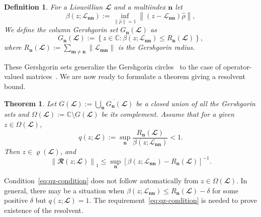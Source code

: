 \documentclass{SciPost}
\newtheorem{theorem}{Theorem}
\newtheorem{definition}{Definition}
\begin{document}
\begin{definition}
    For a Liouvillian $\mathbfcal L$ and a multiindex $\bm n$ let
    \begin{equation}
        \beta(z; \mathcal L_{\bm{n n}})
        :=
        \inf_{\|\hat \rho\| = 1}
        \left\|
        (z - \mathcal L_{\bm n\bm n})\hat \rho
        \right\|,
    \end{equation}
    We define the \emph{column Gershgorin set} $G_{\bm n}(\mathbfcal L)$ as
    \begin{equation}
        G_{\bm n}(\mathbfcal L)
        :=
        \left\{
        z \in \mathbb C :
            \beta(z; \mathcal L_{\bm{n n}}) \leqslant R_{\bm n}(\mathbfcal L)
        \right\},
    \end{equation}
    where $R_{\bm n}(\mathbfcal L)
    :=
    \sum_{\bm m \ne \bm n}
    \|\mathcal L_{\bm m\bm n}\|$ is the \emph{Gershgorin radius}.
    \label{def:gershgorin-set}
\end{definition}
These Gershgorin sets generalize the Gershgorin circles~\cite{Gershgorin1931} to the case of operator-valued matrices~\cite{Salas1999}. We are now ready to formulate a theorem giving a resolvent bound.
\begin{theorem}
    Let
    $
    G(\mathbfcal L)
    :=
    \overline{\bigcup_{\bm n} G_{\bm n}(\mathbfcal L)}
    $
    be a closed union of all the Gershgorin sets and 
    $
    \Omega(\mathbfcal L)
    :=
    \mathbb C \setminus G(\mathbfcal L)
    $
    be its complement.
    Assume that for a given \(z \in \Omega(\mathbfcal L)\),
\begin{equation}
    q(z;\mathbfcal L)
    :=
    \sup_{\bm n}
    \frac{R_{\bm n}(\mathbfcal L)}{\beta(z; \mathcal L_{\bm{n n}})}
    < 1.
    \label{eq:qz-condition}
\end{equation}
Then \(z \in \varrho(\mathbfcal L)\), and
\begin{equation}
    \left\|
    \mathbfcal R(z;\mathbfcal L)
    \right\|_1
    \leqslant
    \sup_{\bm n}
    \left[
        \beta(z; \mathcal L_{\bm{nn}}) - R_{\bm n}(\mathbfcal L)
    \right]^{-1}.
    \label{eq:resolvent-bound-hard-clean}
\end{equation}
\label{th:gershgorin-hard}
\end{theorem}
Condition~\eqref{eq:qz-condition} does not follow automatically from $z \in \Omega(\mathbfcal L)$. In general, there may be a situation when $\beta(z; \mathcal L_{\bm{nn}}) \leqslant R_{\bm n}(\mathbfcal L) - \delta$ for some positive $\delta$ but $q(z; \mathbfcal L) = 1$. The requirement~\eqref{eq:qz-condition} is needed to prove existence of the resolvent.
\end{document}
